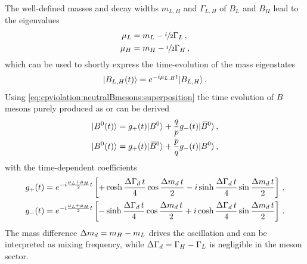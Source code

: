 The well-defined masses and decay widths
$m_{L,H}$ and $\Gamma_{L,H}$ of $B_L$ and $B_H$ lead to the eigenvalues
\begin{align}
\begin{split}
	\mu_L &= m_L - \sfrac{i}{2}\Gamma_L \,,\\
	\mu_H &= m_H - \sfrac{i}{2}\Gamma_H \,,
\end{split}
\end{align}
which can be used to shortly express the time-evolution of the mass eigenstates
\begin{align}
	|B_{L,H}(t)\rangle = e^{-i\mu_{L,H}t} |B_{L,H}\rangle\,.
\end{align}
Using \cref{eq:cpviolation:neutralBmesons:superposition} the time evolution of
$B$ mesons purely produced as \Bd or \Bdb can be derived
\begin{align}
\begin{split}
	|{{B}^0}(t)\rangle = g_+(t)|{{B}^0}\rangle  + \frac qp g_-(t)|{{\kern 0.18em\overline{\kern -0.18em B}{}}{}^0}\rangle\,,\\
	|{{B}^0}(t)\rangle = g_+(t)|{{\kern 0.18em\overline{\kern -0.18em B}{}}{}^0}\rangle + \frac pq g_-(t)|{{B}^0}\rangle \,,
\end{split}
\end{align}
with the time-dependent coefficients
\begin{align}
\begin{split}
	g_+(t) = e^{-i\frac{\mu_L + \mu_H}{2}t}\left[+\cosh\frac{{\Delta\Gamma_{{d}}}\,t}{4} \cos\frac{{\Delta m_{{d}}}\,t}{2} - i \sinh\frac{{\Delta\Gamma_{{d}}}\,t}{4} \sin\frac{{\Delta m_{{d}}}\,t}{2}\right]\,,\\
	g_-(t) = e^{-i\frac{\mu_L + \mu_H}{2}t}\left[-\sinh\frac{{\Delta\Gamma_{{d}}}\,t}{4} \cos\frac{{\Delta m_{{d}}}\,t}{2} + i \cosh\frac{{\Delta\Gamma_{{d}}}\,t}{4} \sin\frac{{\Delta m_{{d}}}\,t}{2}\right]\,.
\end{split}
\end{align}
The mass difference ${\Delta m_{{d}}} = m_H - m_L$ drives the oscillation and can be
interpreted as mixing frequency, while ${\Delta\Gamma_{{d}}} = \Gamma_H - \Gamma_L$ is
negligible in the \Bd meson sector.